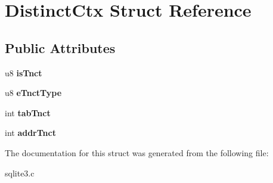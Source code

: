 \hypertarget{structDistinctCtx}{}\section{Distinct\+Ctx Struct Reference}
\label{structDistinctCtx}
\subsection*{Public Attributes}
\begin{DoxyCompactItemize}
\item 
u8 {\bfseries is\+Tnct}\hypertarget{structDistinctCtx_aaaa3b23ad86358ba11b4da77cd753bbd}{}\label{structDistinctCtx_aaaa3b23ad86358ba11b4da77cd753bbd}

\item 
u8 {\bfseries e\+Tnct\+Type}\hypertarget{structDistinctCtx_ae57f819b64420f943f21d8d0e9c36205}{}\label{structDistinctCtx_ae57f819b64420f943f21d8d0e9c36205}

\item 
int {\bfseries tab\+Tnct}\hypertarget{structDistinctCtx_af4514e425f99659e97b2bbe756716517}{}\label{structDistinctCtx_af4514e425f99659e97b2bbe756716517}

\item 
int {\bfseries addr\+Tnct}\hypertarget{structDistinctCtx_a897fdd9a1025f3d6c438a5113cf925d2}{}\label{structDistinctCtx_a897fdd9a1025f3d6c438a5113cf925d2}

\end{DoxyCompactItemize}


The documentation for this struct was generated from the following file\+:\begin{DoxyCompactItemize}
\item 
sqlite3.\+c\end{DoxyCompactItemize}
